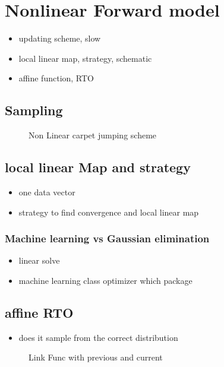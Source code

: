 \chapter{Nonlinear Forward model}
\begin{itemize}
	\item updating scheme, slow
	\item local linear map, strategy, schematic
	\item affine function, RTO
\end{itemize}

\section{Sampling}

\begin{figure}[h]
	\centering
	\scalebox{0.66}{}
	\caption[]{Non Linear carpet jumping scheme}
	\label{fig:Results}
\end{figure}

\section{local linear Map and strategy}
\begin{itemize}
	\item one data vector
	\item strategy to find convergence and local linear map
\end{itemize}
\subsection{Machine learning vs Gaussian elimination}
\begin{itemize}
	\item linear solve
	\item machine learning class optimizer which package
\end{itemize}
\section{affine RTO}
\begin{itemize}
	\item does it sample from the correct distribution
\end{itemize}
\begin{figure}[h]
	\centering
	\scalebox{0.66}{}
	\caption[]{Link Func with previous and current}
	\label{fig:Results}
\end{figure}